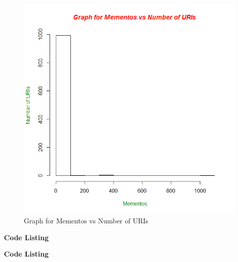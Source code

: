 \begin{figure}[h!]
\begin{center}
\includegraphics[scale=0.55, keepaspectratio=true]{figures/q2Graph.png}
\caption{Graph for Mementos vs Number of URIs}
\label{fig:fig1}
\end{center}
\end{figure}

\newpage
\textbf{Code Listing}


\textbf{Code Listing}



